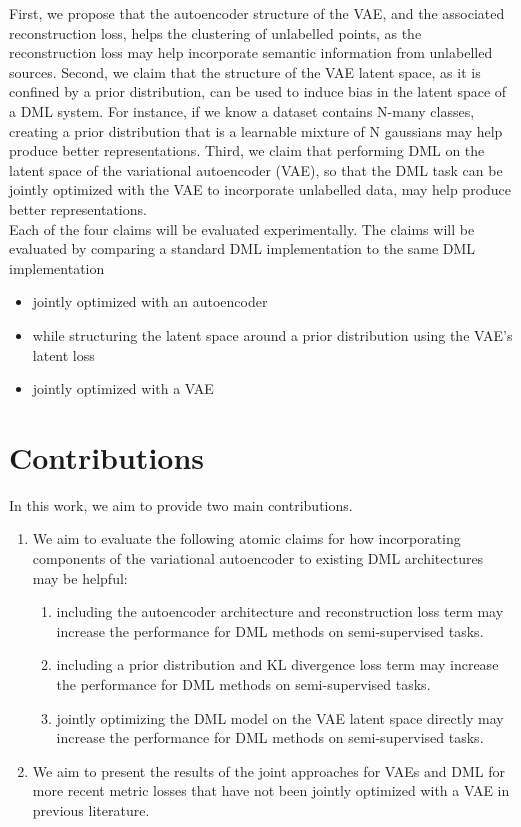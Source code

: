 \documentclass[./dissertation.tex]{subfiles}
\begin{document}
    First, we propose that the autoencoder structure of the VAE, and the associated reconstruction loss, helps the clustering of unlabelled points, as the reconstruction loss may help incorporate semantic information from unlabelled sources. Second, we claim that the structure of the VAE latent space, as it is confined by a prior distribution, can be used to induce bias in the latent space of a DML system. For instance, if we know a dataset contains N-many classes, creating a prior distribution that is a learnable mixture of N gaussians may help produce better representations. Third, we claim that performing DML on the latent space of the variational autoencoder (VAE), so that the DML task can be jointly optimized with the VAE to incorporate unlabelled data, may help produce better representations. \\
    
    Each of the four claims will be evaluated experimentally. The claims will be evaluated by comparing a standard DML implementation to the same DML implementation
    \begin{itemize}
        \item jointly optimized with an autoencoder
        \item while structuring the latent space around a prior distribution using the VAE’s latent loss
        \item jointly optimized with a VAE
    \end{itemize}

    \section{Contributions}
    In this work, we aim to provide two main contributions. 
    \begin{enumerate}
        \item We aim to evaluate the following atomic claims for how incorporating components of the variational autoencoder to existing DML architectures may be helpful:
        \begin{enumerate}
            \item including the autoencoder architecture and reconstruction loss term may increase the performance for DML methods on semi-supervised tasks.
            \item including a prior distribution and KL divergence loss term may increase the performance for DML methods on semi-supervised tasks.
            \item jointly optimizing the DML model on the VAE latent space directly may increase the performance for DML methods on semi-supervised tasks.
        \end{enumerate}
        \item We aim to present the results of the joint approaches for VAEs and DML for more recent metric losses that have not been jointly optimized with a VAE in previous literature. 
    \end{enumerate}
\end{document}

